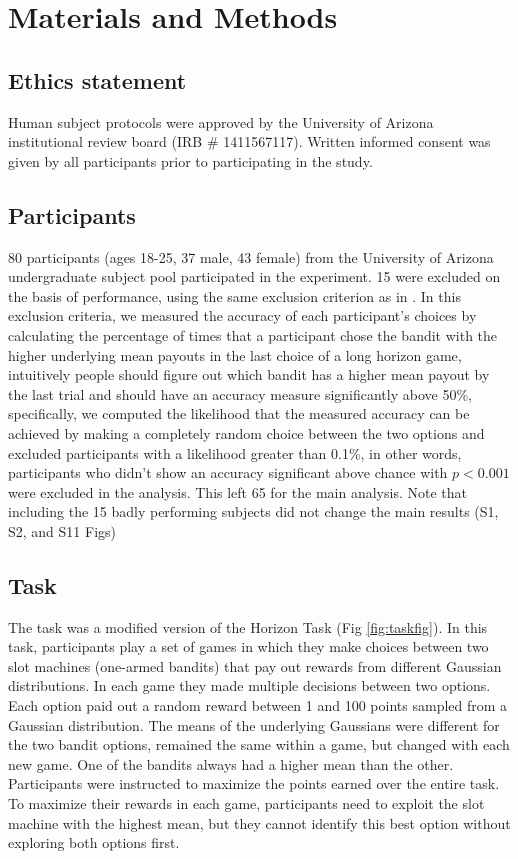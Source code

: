 \documentclass[12pt]{article}
\begin{document}
{\section*{Materials and Methods}
\subsection*{Ethics statement}
Human subject protocols were approved by the University of Arizona institutional review board (IRB \# 1411567117). Written informed consent was given by all participants prior to participating in the study. 

\subsection*{Participants}
80 participants (ages 18-25, 37 male, 43 female) from the University of Arizona undergraduate subject pool participated in the experiment. 15 were excluded on the basis of performance, using the same exclusion criterion as in \cite{wilson2014}. In this exclusion criteria, we measured the accuracy of each participant's choices by calculating the percentage of times that a participant chose the bandit with the higher underlying mean payouts in the last choice of a long horizon game, intuitively people should figure out which bandit has a higher mean payout by the last trial and should have an accuracy measure significantly above 50\%, specifically, we computed the likelihood that the measured accuracy can be achieved by making a completely random choice between the two options and excluded participants with a likelihood greater than 0.1\%, in other words, participants who didn't show an accuracy significant above chance with $p < 0.001$ were excluded in the analysis. This left 65 for the main analysis. Note that including the 15 badly performing subjects did not change the main results (S1, S2, and S11 Figs)

\subsection*{Task}
The task was a modified version of the Horizon Task \citep{wilson2014} (Fig \ref{fig:taskfig}). In this task, participants play a set of games in which they make choices between two slot machines (one-armed bandits) that pay out rewards from different Gaussian distributions. In each game they made multiple decisions between two options. Each option paid out a random reward between 1 and 100 points sampled from a Gaussian distribution. The means of the underlying Gaussians were different for the two bandit options, remained the same within a game, but changed with each new game. One of the bandits always had a higher mean than the other. Participants were instructed to maximize the points earned over the entire task. To maximize their rewards in each game, participants need to exploit the slot machine with the highest mean, but they cannot identify this best option without exploring both options first. 

}
\end{document}
